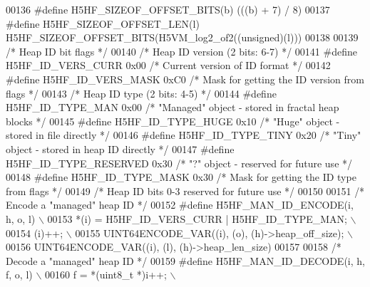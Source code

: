 \begin{DoxyCode}
00136 \textcolor{preprocessor}{#define H5HF\_SIZEOF\_OFFSET\_BITS(b)   (((b) + 7) / 8)}
00137 \textcolor{preprocessor}{#define H5HF\_SIZEOF\_OFFSET\_LEN(l)   H5HF\_SIZEOF\_OFFSET\_BITS(H5VM\_log2\_of2((unsigned)(l)))}
00138 
00139 \textcolor{comment}{/* Heap ID bit flags */}
00140 \textcolor{comment}{/* Heap ID version (2 bits: 6-7) */}
00141 \textcolor{preprocessor}{#define H5HF\_ID\_VERS\_CURR       0x00    }\textcolor{comment}{/* Current version of ID format */}\textcolor{preprocessor}{}
00142 \textcolor{preprocessor}{#define H5HF\_ID\_VERS\_MASK       0xC0    }\textcolor{comment}{/* Mask for getting the ID version from flags */}\textcolor{preprocessor}{}
00143 \textcolor{comment}{/* Heap ID type (2 bits: 4-5) */}
00144 \textcolor{preprocessor}{#define H5HF\_ID\_TYPE\_MAN        0x00    }\textcolor{comment}{/* "Managed" object - stored in fractal heap blocks */}\textcolor{preprocessor}{}
00145 \textcolor{preprocessor}{#define H5HF\_ID\_TYPE\_HUGE       0x10    }\textcolor{comment}{/* "Huge" object - stored in file directly */}\textcolor{preprocessor}{}
00146 \textcolor{preprocessor}{#define H5HF\_ID\_TYPE\_TINY       0x20    }\textcolor{comment}{/* "Tiny" object - stored in heap ID directly */}\textcolor{preprocessor}{}
00147 \textcolor{preprocessor}{#define H5HF\_ID\_TYPE\_RESERVED   0x30    }\textcolor{comment}{/* "?" object - reserved for future use */}\textcolor{preprocessor}{}
00148 \textcolor{preprocessor}{#define H5HF\_ID\_TYPE\_MASK       0x30    }\textcolor{comment}{/* Mask for getting the ID type from flags */}\textcolor{preprocessor}{}
00149 \textcolor{comment}{/* Heap ID bits 0-3 reserved for future use */}
00150 
00151 \textcolor{comment}{/* Encode a "managed" heap ID */}
00152 \textcolor{preprocessor}{#define H5HF\_MAN\_ID\_ENCODE(i, h, o, l)                                        \(\backslash\)}
00153 \textcolor{preprocessor}{    *(i) = H5HF\_ID\_VERS\_CURR | H5HF\_ID\_TYPE\_MAN;                              \(\backslash\)}
00154 \textcolor{preprocessor}{    (i)++;                                                                    \(\backslash\)}
00155 \textcolor{preprocessor}{    UINT64ENCODE\_VAR((i), (o), (h)->heap\_off\_size);                           \(\backslash\)}
00156 \textcolor{preprocessor}{    UINT64ENCODE\_VAR((i), (l), (h)->heap\_len\_size)}
00157 
00158 \textcolor{comment}{/* Decode a "managed" heap ID */}
00159 \textcolor{preprocessor}{#define H5HF\_MAN\_ID\_DECODE(i, h, f, o, l)                                     \(\backslash\)}
00160 \textcolor{preprocessor}{    f = *(uint8\_t *)i++;                                                      \(\backslash\)}

\end{DoxyCode}
